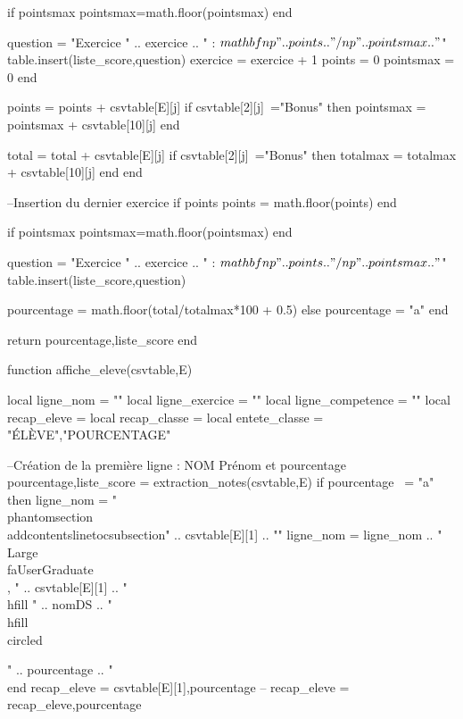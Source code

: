 \documentclass{article}
\newcommand*\circled[1]{\tikz[baseline=(char.base)]{
            \node[shape=circle,draw,inner sep=2pt] (char) {#1};}}
\begin{document}
\begin{luacode*}
                    if pointsmax%
                        pointsmax=math.floor(pointsmax)
                    end
    
                    question = "Exercice " .. exercice .. " : $\\mathbf{\\np{" .. points .. "}/\\np{" .. pointsmax .. "}}$"
                    table.insert(liste_score,question)
                    exercice = exercice + 1
                    points = 0
                    pointsmax = 0
                end
    
                points = points + csvtable[E][j]
                if csvtable[2][j]~="Bonus" then
                    pointsmax = pointsmax + csvtable[10][j]
                end
    
                total = total + csvtable[E][j]
                if csvtable[2][j]~="Bonus" then
                    totalmax = totalmax + csvtable[10][j]
                end
            end
    
            --Insertion du dernier exercice
            if points%
                points = math.floor(points)
            end
    
            if pointsmax%
                pointsmax=math.floor(pointsmax)
            end
    
            question = "Exercice " .. exercice .. " : $\\mathbf{\\np{" .. points .. "}/\\np{" .. pointsmax .. "}}$"
            table.insert(liste_score,question)
    
            pourcentage = math.floor(total/totalmax*100 + 0.5)
        else
            pourcentage = "a"
        end
    
        return pourcentage,liste_score
    end
    
    function affiche_eleve(csvtable,E)
       
        local ligne_nom = ""
        local ligne_exercice = ""
        local ligne_competence = ""
        local recap_eleve = {}
        local recap_classe = {}
        local entete_classe = {"ÉLÈVE","POURCENTAGE"}
    
        --Création de la première ligne : NOM Prénom et pourcentage
        pourcentage,liste_score = extraction_notes(csvtable,E)
        if pourcentage ~= "a" then
            ligne_nom = "\\phantomsection\\addcontentsline{toc}{subsection}{" .. csvtable[E][1] .. "}"
            ligne_nom = ligne_nom .. "\\Large\\faUserGraduate\\, " .. csvtable[E][1] .. "\\hfill " .. nomDS .. " \\hfill \\circled{" .. pourcentage .. "\\%
        end
        recap_eleve = {csvtable[E][1],pourcentage}
        -- recap_eleve = recap_eleve,pourcentage
    
}
\end{luacode*}
\end{document}
